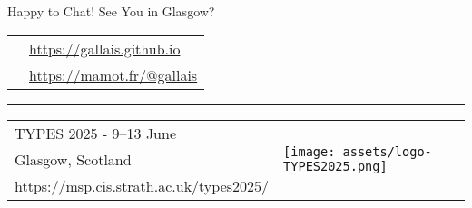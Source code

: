 \documentclass[3to2]{beamer}
\newcommand{\mastodon}{\texttt{[image: assets/mastodon-logo-purple.png]}}
\newcommand{\globe}{\texttt{[image: assets/globe.png]}}
\newcommand{\typesstrathclyde}{\texttt{[image: assets/logo-TYPES2025.png]}}
\begin{document}
\begin{frame}{Happy to Chat! See You in Glasgow?}
  \Large\centering
  \renewcommand\UrlFont{}
  \begin{tabular}{ll}
    \raisebox{-2pt}{\globe} &  \url{https://gallais.github.io} \\
    \raisebox{-4pt}{\mastodon} & \url{https://mamot.fr/@gallais}
  \end{tabular}

  \vfill
  {\centering\rule{.8\textwidth}{1pt}}
  \vfill


  \begin{tabular}{ll}
    TYPES 2025 - 9–13 June & \multirow{3}{*}{\typesstrathclyde} \\
    Glasgow, Scotland\\
    \url{https://msp.cis.strath.ac.uk/types2025/}
  \end{tabular}
\end{frame}
\end{document}
